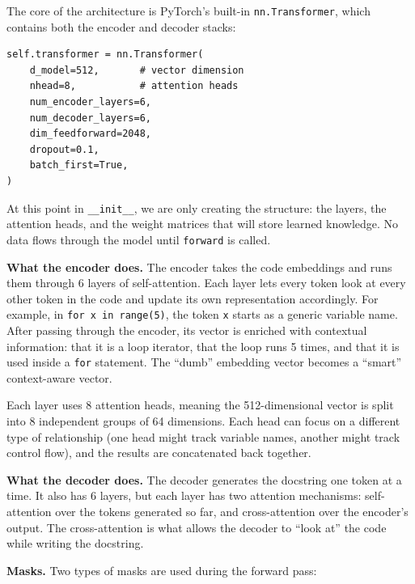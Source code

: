\documentclass[11pt]{article}
\begin{document}
The core of the architecture is PyTorch's built-in \texttt{nn.Transformer}, which contains both the encoder and decoder stacks:

\begin{lstlisting}[style=python]
self.transformer = nn.Transformer(
    d_model=512,       # vector dimension
    nhead=8,           # attention heads
    num_encoder_layers=6,
    num_decoder_layers=6,
    dim_feedforward=2048,
    dropout=0.1,
    batch_first=True,
)
\end{lstlisting}

At this point in \texttt{\_\_init\_\_}, we are only creating the structure: the layers, the attention heads, and the weight matrices that will store learned knowledge. No data flows through the model until \texttt{forward} is called.

\textbf{What the encoder does.} The encoder takes the code embeddings and runs them through 6 layers of self-attention. Each layer lets every token look at every other token in the code and update its own representation accordingly. For example, in \texttt{for x in range(5)}, the token \texttt{x} starts as a generic variable name. After passing through the encoder, its vector is enriched with contextual information: that it is a loop iterator, that the loop runs 5 times, and that it is used inside a \texttt{for} statement. The ``dumb'' embedding vector becomes a ``smart'' context-aware vector.

Each layer uses 8 attention heads, meaning the 512-dimensional vector is split into 8 independent groups of 64 dimensions. Each head can focus on a different type of relationship (one head might track variable names, another might track control flow), and the results are concatenated back together.

\textbf{What the decoder does.} The decoder generates the docstring one token at a time. It also has 6 layers, but each layer has two attention mechanisms: self-attention over the tokens generated so far, and cross-attention over the encoder's output. The cross-attention is what allows the decoder to ``look at'' the code while writing the docstring.

\textbf{Masks.} Two types of masks are used during the forward pass:
\end{document}
